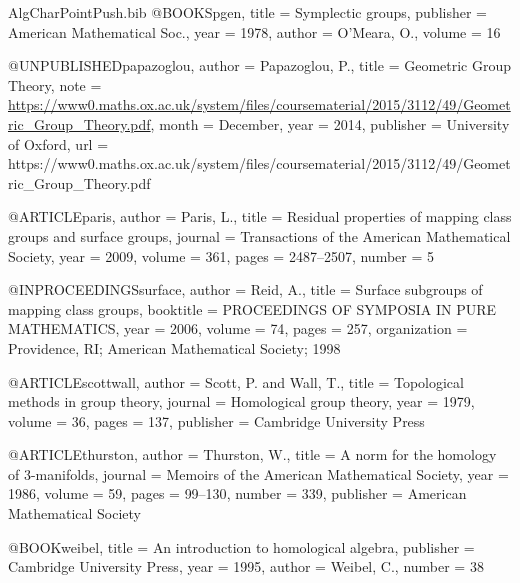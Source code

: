 \documentclass[a4paper]{amsproc}
\theoremstyle{TheoremNum}
\theoremstyle{Theorembold}
\theoremstyle{TheoremboldDef}
\theoremstyle{TheoremboldRem}
\theoremstyle{TheoremboldRem}
\begin{document}
\begin{filecontents}{AlgCharPointPush.bib}
@BOOK{Spgen,
  title = {Symplectic groups},
  publisher = {American Mathematical Soc.},
  year = {1978},
  author = {O'Meara, O.},
  volume = {16}
}

@UNPUBLISHED{papazoglou,
  author = {Papazoglou, P.},
  title = {Geometric Group Theory},
  note = {\url{https://www0.maths.ox.ac.uk/system/files/coursematerial/2015/3112/49/Geometric_Group_Theory.pdf}},
  month = {December},
  year = {2014},
  publisher = {University of Oxford},
  url = {https://www0.maths.ox.ac.uk/system/files/coursematerial/2015/3112/49/Geometric_Group_Theory.pdf}
}

@ARTICLE{paris,
  author = {Paris, L.},
  title = {Residual properties of mapping class groups and surface groups},
  journal = {Transactions of the American Mathematical Society},
  year = {2009},
  volume = {361},
  pages = {2487--2507},
  number = {5}
}

@INPROCEEDINGS{surface,
  author = {Reid, A.},
  title = {Surface subgroups of mapping class groups},
  booktitle = {PROCEEDINGS OF SYMPOSIA IN PURE MATHEMATICS},
  year = {2006},
  volume = {74},
  pages = {257},
  organization = {Providence, RI; American Mathematical Society; 1998}
}

@ARTICLE{scottwall,
  author = {Scott, P. and Wall, T.},
  title = {Topological methods in group theory},
  journal = {Homological group theory},
  year = {1979},
  volume = {36},
  pages = {137},
  publisher = {Cambridge University Press}
}

@ARTICLE{thurston,
  author = {Thurston, W.},
  title = {A norm for the homology of 3-manifolds},
  journal = {Memoirs of the American Mathematical Society},
  year = {1986},
  volume = {59},
  pages = {99--130},
  number = {339},
  publisher = {American Mathematical Society}
}

@BOOK{weibel,
  title = {An introduction to homological algebra},
  publisher = {Cambridge University Press},
  year = {1995},
  author = {Weibel, C.},
  number = {38}
}
\end{filecontents}



 
\end{document}
